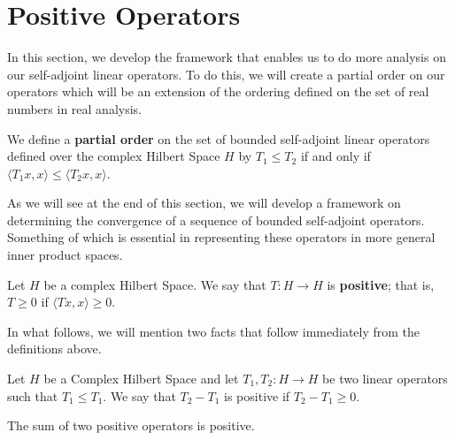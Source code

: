 \section{Positive Operators}

In this section, we develop the framework that enables us to do more analysis on our self-adjoint linear operators. To do this, we will create a partial order on our operators which will be an extension of the ordering defined on the set of real numbers in real analysis.

\begin{definition}
    We define a \textbf{partial order} on the set of bounded self-adjoint linear operators defined over the complex Hilbert Space \( H  \) by \( {T}_{1} \leq {T}_{2}  \) if and only if \( \langle {T}_{1}x  , x   \rangle \leq \langle {T}_{2} x  ,  x  \rangle  \).
\end{definition}

As we will see at the end of this section, we will develop a framework on determining the convergence of a sequence of bounded self-adjoint operators. Something of which is essential in representing these operators in more general inner product spaces. 

\begin{definition}
    Let \( H  \) be a complex Hilbert Space. We say that \( T: H \to  H \) is \textbf{positive}; that is, \( T \geq  0  \) if \( \langle Tx  ,  x  \rangle \geq 0  \).
\end{definition}

In what follows, we will mention two facts that follow immediately from the definitions above. 

\begin{lemma}
    Let \( H  \) be a Complex Hilbert Space and let \( {T}_{1}, {T}_{2} : H \to H  \) be two linear operators such that \( {T}_{1} \leq {T}_{1} \). We say that \( {T}_{2} - {T}_{1}  \) is positive if \( {T}_{2} - {T}_{1} \geq 0  \). 
\end{lemma}

\begin{lemma}
    The sum of two positive operators is positive.
\end{lemma}

